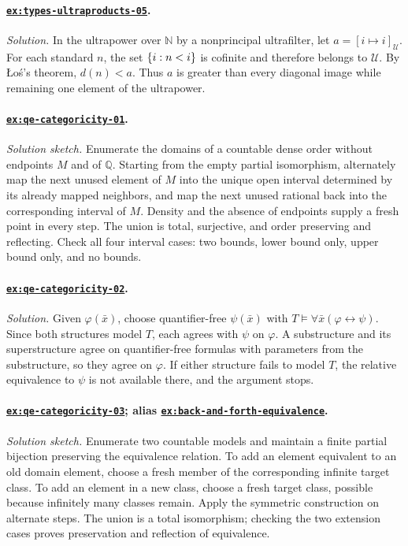 \documentclass[11pt,oneside,openany]{book}
\theoremstyle{definition}
\theoremstyle{plain}
\theoremstyle{remark}
\DeclarePairedDelimiter{\set}{\lbrace}{\rbrace}
\newcommand{\N}{\mathbb{N}}
\newcommand{\Q}{\mathbb{Q}}
\newcommand{\entails}{\models}
\begin{document}
\paragraph{\hyperref[ex:types-ultraproducts-05]{\texttt{ex:types-ultraproducts-05}}.}
\textit{Solution.}  In the ultrapower over \(\N\) by a nonprincipal
ultrafilter, let \(a=[i\mapsto i]_{\mathcal U}\).  For each standard \(n\),
the set \(\set{i:n<i}\) is cofinite and therefore belongs to
\(\mathcal U\).  By \L{}o\'s's theorem, \(d(n)<a\).  Thus \(a\) is greater
than every diagonal image while remaining one element of the ultrapower.

\paragraph{\hyperref[ex:qe-categoricity-01]{\texttt{ex:qe-categoricity-01}}.}
\textit{Solution sketch.}  Enumerate the domains of a countable dense order
without endpoints \(M\) and of \(\Q\).  Starting from the empty partial
isomorphism, alternately map the next unused element of \(M\) into the unique
open interval determined by its already mapped neighbors, and map the next
unused rational back into the corresponding interval of \(M\).  Density and
the absence of endpoints supply a fresh point in every step.  The union is
total, surjective, and order preserving and reflecting.  Check all four interval
cases: two bounds, lower bound only, upper bound only, and no bounds.

\paragraph{\hyperref[ex:qe-categoricity-02]{\texttt{ex:qe-categoricity-02}}.}
\textit{Solution.}  Given \(\varphi(\bar x)\), choose quantifier-free
\(\psi(\bar x)\) with
\(T\entails\forall\bar x(\varphi\leftrightarrow\psi)\).  Since both
structures model \(T\), each agrees with \(\psi\) on \(\varphi\).  A
substructure and its superstructure agree on quantifier-free formulas with
parameters from the substructure, so they agree on \(\varphi\).  If either
structure fails to model \(T\), the relative equivalence to \(\psi\) is not
available there, and the argument stops.

\paragraph{\hyperref[ex:qe-categoricity-03]{\texttt{ex:qe-categoricity-03}};
alias \hyperref[ex:back-and-forth-equivalence]{\texttt{ex:back-and-forth-equivalence}}.}
\textit{Solution sketch.}  Enumerate two countable models and maintain a finite
partial bijection preserving the equivalence relation.  To add an element
equivalent to an old domain element, choose a fresh member of the corresponding
infinite target class.  To add an element in a new class, choose a fresh target
class, possible because infinitely many classes remain.  Apply the symmetric
construction on alternate steps.  The union is a total isomorphism; checking
the two extension cases proves preservation and reflection of equivalence.
\end{document}
